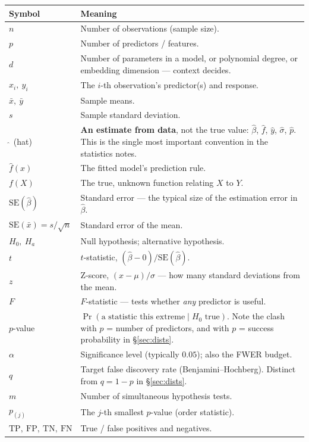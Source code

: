\documentclass[10pt,letterpaper,onecolumn]{article}
\makeatletter
\newenvironment{symtab}
  {\begin{longtable}{@{}>{\raggedright\arraybackslash}p{0.26\textwidth}%
                       >{\raggedright\arraybackslash}p{0.70\textwidth}@{}}
   \toprule
   \textbf{Symbol} & \textbf{Meaning} \\
   \midrule
   \endhead
   \bottomrule
   \endfoot}
  {\end{longtable}}
\makeatother
\begin{document}
\begin{symtab}
$n$ & Number of observations (sample size). \\
$p$ & Number of predictors / features. \\
$d$ & Number of parameters in a model, or polynomial degree, or embedding dimension — context decides. \\
$x_i,\ y_i$ & The $i$-th observation's predictor(s) and response. \\
$\bar{x},\ \bar{y}$ & Sample means. \\
$s$ & Sample standard deviation. \\
$\hat{\ }$ (hat) & \textbf{An estimate from data}, not the true value: $\hat\beta$, $\hat f$, $\hat y$, $\hat\sigma$, $\hat p$. This is the single most important convention in the statistics notes. \\
$\hat f(x)$ & The fitted model's prediction rule. \\
$f(X)$ & The true, unknown function relating $X$ to $Y$. \\
$\mathrm{SE}(\hat\beta)$ & Standard error — the typical size of the estimation error in $\hat\beta$. \\
$\mathrm{SE}(\bar x) = s/\sqrt{n}$ & Standard error of the mean. \\
$H_0,\ H_a$ & Null hypothesis; alternative hypothesis. \\
$t$ & $t$-statistic, $(\hat\beta - 0)/\mathrm{SE}(\hat\beta)$. \\
$z$ & Z-score, $(x-\mu)/\sigma$ — how many standard deviations from the mean. \\
$F$ & $F$-statistic — tests whether \emph{any} predictor is useful. \\
$p$-value & $\Pr(\text{a statistic this extreme} \mid H_0 \text{ true})$. Note the clash with $p$ = number of predictors, and with $p$ = success probability in \S\ref{sec:dists}. \\
$\alpha$ & Significance level (typically $0.05$); also the FWER budget. \\
$q$ & Target false discovery rate (Benjamini--Hochberg). Distinct from $q=1-p$ in \S\ref{sec:dists}. \\
$m$ & Number of simultaneous hypothesis tests. \\
$p_{(j)}$ & The $j$-th smallest $p$-value (order statistic). \\
$\mathrm{TP},\ \mathrm{FP},\ \mathrm{TN},\ \mathrm{FN}$ & True / false positives and negatives. \\
\end{symtab}
\end{document}
